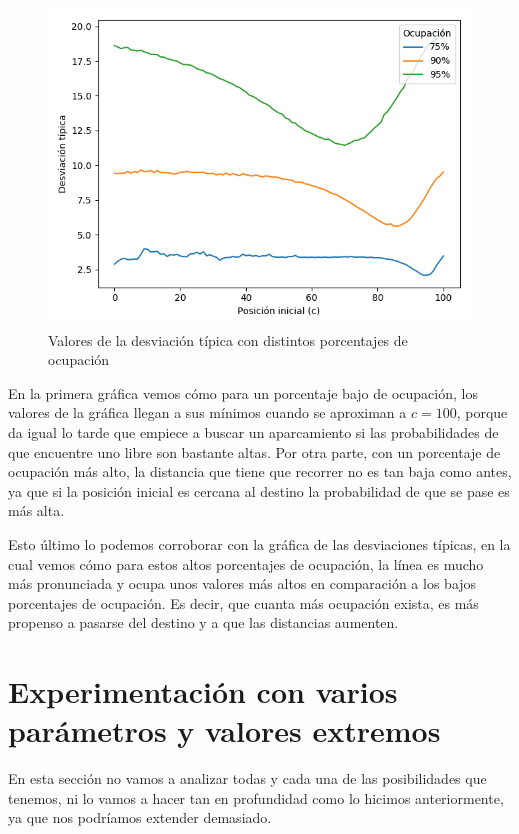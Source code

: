 \documentclass[11pt,a4paper]{report}
\begin{document}
\begin{figure}[H]
\centering
\includegraphics[scale=0.6]{img/dt-100-2-75.png}
\caption{Valores de la desviación típica con distintos porcentajes de ocupación}
\end{figure}

En la primera gráfica vemos cómo para un porcentaje bajo de ocupación, los valores de la gráfica llegan a sus mínimos cuando
se aproximan a $c=100$, porque da igual lo tarde que empiece a buscar un aparcamiento si las probabilidades de que encuentre
uno libre son bastante altas. Por otra parte, con un porcentaje de ocupación más alto, la distancia que tiene que recorrer
no es tan baja como antes, ya que si la posición inicial es cercana al destino la probabilidad de que se pase es más alta.

Esto último lo podemos corroborar con la gráfica de las desviaciones típicas, en la cual vemos cómo para estos altos porcentajes
de ocupación, la línea es mucho más pronunciada y ocupa unos valores más altos en comparación a los bajos porcentajes de ocupación.
Es decir, que cuanta más ocupación exista, es más propenso a pasarse del destino y a que las distancias aumenten.


\section{Experimentación con varios parámetros y valores extremos}

En esta sección no vamos a analizar todas y cada una de las posibilidades que tenemos, ni lo vamos a hacer tan en profundidad
como lo hicimos anteriormente, ya que nos podríamos extender demasiado.
\end{document}
